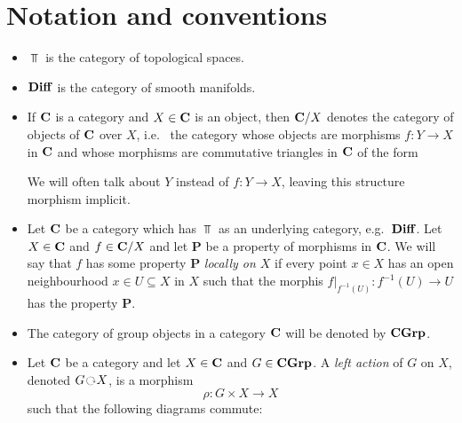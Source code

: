 \section*{Notation and conventions}

\begin{itemize}
    \item $\Top$ is the category of topological spaces.
    \item $\mathbf{Diff}$ is the category of smooth manifolds.
    \item If $\mathbf{C}$ is a category and $X\in \mathbf{C}$ is an object, then $\mathbf{C}/X$ denotes the category of objects of $\mathbf{C}$ over $X$, i.e.~ the category whose objects are morphisms $f\colon Y\to X$ in $\mathbf{C}$ and whose morphisms are commutative triangles in $\mathbf{C}$ of the form
	\begin{center}
	\end{center}
	We will often talk about $Y$ instead of $f\colon Y\to X$, leaving this structure morphism implicit.
    \item Let $\mathbf{C}$ be a category which has $\Top$ as an underlying category, e.g.~$\mathbf{Diff}$.
	Let $X\in \mathbf{C}$ and $f\in \mathbf{C}/X$ and let $\mathbf{P}$ be a property of morphisms in $\mathbf{C}$.
	We will say that $f$ has some property $\mathbf{P}$ \textit{locally on $X$} if every point $x\in X$ has an open neighbourhood $x\in U\subseteq X$ in $X$ such that the morphis $f|_{f^{-1}(U)}\colon f^{-1}(U)\to U$ has the property $\mathbf{P}$.
    \item The category of group objects in a category $\mathbf{C}$ will be denoted by $\mathbf{C}\mathbf{Grp}$.
    \item Let $\mathbf{C}$ be a category and let $X\in \mathbf{C}$ and $G\in \mathbf{C}\mathbf{Grp}$.
	A \textit{left action} of $G$ on $X$, denoted $G\act X$, is a morphism
	\[ \rho\colon G\times X\to X \]
	such that the following diagrams commute:
	\begin{center}
	\end{center}

\end{itemize}
